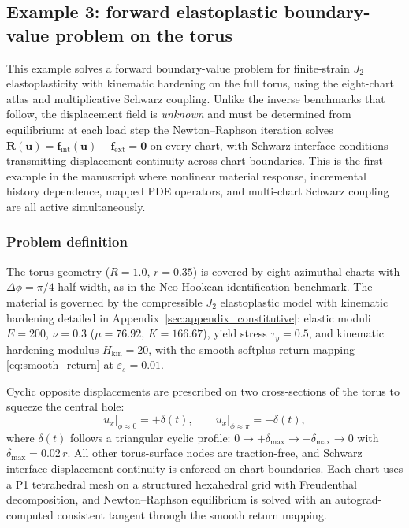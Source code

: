 \documentclass[sort&compress]{svjour3} %
\begin{document}
\subsection{Example 3: forward elastoplastic boundary-value problem on the torus}
\label{sec:example3_bvp}

This example solves a forward boundary-value problem for finite-strain $J_2$ elastoplasticity with kinematic hardening on the full torus, using the eight-chart atlas and multiplicative Schwarz coupling. Unlike the inverse benchmarks that follow, the displacement field is \emph{unknown} and must be determined from equilibrium: at each load step the Newton--Raphson iteration solves $\mathbf{R}(\mathbf{u})=\mathbf{f}_{\mathrm{int}}(\mathbf{u})-\mathbf{f}_{\mathrm{ext}}=\mathbf{0}$ on every chart, with Schwarz interface conditions transmitting displacement continuity across chart boundaries. This is the first example in the manuscript where nonlinear material response, incremental history dependence, mapped PDE operators, and multi-chart Schwarz coupling are all active simultaneously.

\subsubsection{Problem definition}

The torus geometry ($R=1.0$, $r=0.35$) is covered by eight azimuthal charts with $\Delta\phi=\pi/4$ half-width, as in the Neo-Hookean identification benchmark. The material is governed by the compressible $J_2$ elastoplastic model with kinematic hardening detailed in Appendix~\ref{sec:appendix_constitutive}: elastic moduli $E=200$, $\nu=0.3$ ($\mu=76.92$, $K=166.67$), yield stress $\tau_y=0.5$, and kinematic hardening modulus $H_{\mathrm{kin}}=20$, with the smooth softplus return mapping \eqref{eq:smooth_return} at $\varepsilon_s=0.01$.

Cyclic opposite displacements are prescribed on two cross-sections of the torus to squeeze the central hole:
\begin{equation}
u_x\big|_{\phi\approx 0} = +\delta(t),
\qquad
u_x\big|_{\phi\approx \pi} = -\delta(t),
\label{eq:bvp_bc}
\end{equation}
where $\delta(t)$ follows a triangular cyclic profile: $0\to+\delta_{\max}\to-\delta_{\max}\to0$ with $\delta_{\max}=0.02\,r$. All other torus-surface nodes are traction-free, and Schwarz interface displacement continuity is enforced on chart boundaries. Each chart uses a P1 tetrahedral mesh on a structured hexahedral grid with Freudenthal decomposition, and Newton--Raphson equilibrium is solved with an autograd-computed consistent tangent through the smooth return mapping.
\end{document}
